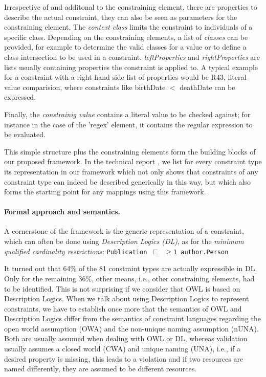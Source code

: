 \documentclass[a4paper,fontsize=11pt]{scrartcl}
\newcommand{\ms}[1]{\texttt{#1}}
\begin{document}
Irrespective of and additonal to the constraining element, there are properties to describe the actual constraint, they can also be seen as parameters for the constraining element. The \emph{context class} limits the constraint to individuals of a specific class. Depending on the constraining elements, a list of \emph{classes} can be provided, for example to determine the valid classes for a value or to define a class intersection to be used in a constraint. \emph{leftProperties} and \emph{rightProperties} are lists usually containing properties the constraint is applied to. A typical example for a constraint with a right hand side list of properties would be R43, literal value comparision, where constraints like birthDate $<$ deathDate can be expressed.

Finally, the \emph{constrainig value} contains a literal value to be checked against; for instance in the case of the 'regex' element, it contains the regular expression to be evaluated.

This simple structure plus the constraining elements form the building blocks of our proposed framework. In the technical report \cite{BoschNolleAcarEckert2015}, we list for every constraint type its representation in our framework which not only shows that constraints of any constraint type can indeed be described generically in this way, but which also forms the starting point for any mappings using this framework.

\paragraph{Formal approach and semantics.}

A cornerstone of the framework is the generic representation of a constraint, which can often be done using \emph{Description Logics (DL)}, as for the \emph{minimum qualified cardinality restrictions}: {\small\ms{Publication $\sqsubseteq$ $\geq$1 author.Person}}

It turned out that 64\% of the 81 constraint types are actually expressible in DL. Only for the remaining 36\%, other means, i.e., other constraining elements, had to be identified. This is not surprising if we consider that OWL is based on Description Logics. When we talk about using Description Logics to represent constraints, we have to establish once more that the semantics of OWL and Description Logics differ from the semantics of constraint languages regarding the open world assumption (OWA) and the non-unique naming assumption (nUNA). Both are usually assumed when dealing with OWL or DL, whereas validation usually assumes a closed world (CWA) and unique naming (UNA), i.e., if a desired property is missing, this leads to a violation and if two resources are named differently, they are assumed to be different resources. 
\end{document}
